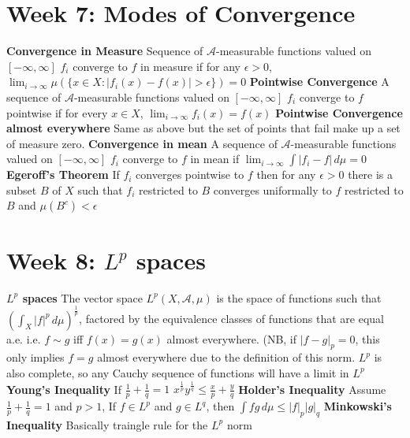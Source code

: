 \documentclass{article}
\begin{document}
\section{Week 7: Modes of Convergence}
 \textbf{Convergence in Measure} Sequence of $\mathcal{A}$-measurable functions valued on $[-\infty, \infty]$ $f_i$ converge to $f$ in measure if for any $\epsilon > 0$, $\lim_{i\to\infty}\mu(\{x \in X : |f_i(x) - f(x)| > \epsilon \}) = 0$
 \newline \newline \textbf{Pointwise Convergence} A sequence of $\mathcal{A}$-measurable functions valued on $[-\infty, \infty]$ $f_i$ converge to $f$ pointwise if for every $x \in X$, $\lim_{i\to\infty} f_i(x) = f(x)$
 \newline \newline \textbf{Pointwise Convergence almost everywhere} Same as above but the set of points that fail make up a set of measure zero.
 \newline \newline \textbf{Convergence in mean} A sequence of $\mathcal{A}$-measurable functions valued on $[-\infty, \infty]$ $f_i$ converge to $f$ in mean if $ \lim_{i\to\infty}\int |f_i - f| \,d\mu = 0$
 \newline \newline \textbf{Egeroff's Theorem} If $f_i$ converges pointwise to $f$ then for any $\epsilon > 0$ there is a subset $B$ of $X$ such that $f_i$ restricted to $B$ converges uniformally to $f$ restricted to $B$ and $\mu(B^c) < \epsilon$
\section{Week 8: $L^{p}$ spaces}
\textbf{$L^{p}$ spaces} The vector space $L^{p}(X, \mathcal{A}, \mu)$ is the space of functions such that $(\int_X |f|^p \,d\mu)^{\frac{1}{p}}$, factored by the equivalence classes of functions that are equal a.e. i.e. $f \sim g$ iff $f(x) = g(x)$ almost everywhere.
\newline \newline (NB, if $|f-g|_{p} = 0$, this only implies $f = g$ almost everywhere due to the definition of this norm. $L^p$ is also complete, so any Cauchy sequence of functions will have a limit in $L^p$
\newline \newline \textbf{Young's Inequality} If $\frac{1}{p} + \frac{1}{q} = 1$ $x^{\frac{1}{p}}y^{\frac{1}{q}} \leq \frac{x}{p} + \frac{y}{q}$
\newline \newline \textbf{Holder's Inequality} Assume $\frac{1}{p} + \frac{1}{q} = 1$ and $p > 1$, If $f \in L^p$ and $g \in L^q$, then $\int fg \,d\mu \leq |f|_p|g|_q$
\newline \newline \textbf{Minkowski's Inequality} Basically traingle rule for the $L^p$ norm
\end{document}
